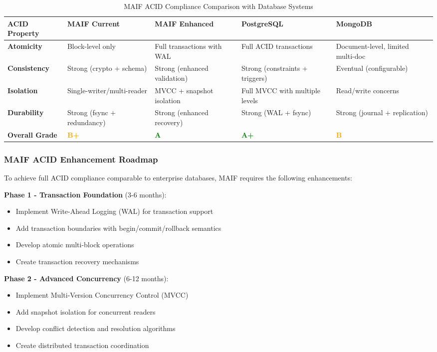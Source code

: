 \documentclass[conference]{IEEEtran}
\begin{document}
\begin{itemize}[leftmargin=*]
\begin{table*}[!t]
\renewcommand{\arraystretch}{1.3}
\caption{MAIF ACID Compliance Comparison with Database Systems}
\label{tab:acid-compliance}
\centering
\footnotesize
\begin{tabular}{p{2.5cm}p{3cm}p{3cm}p{3cm}p{3cm}}
\toprule
\textbf{ACID Property} & \textbf{MAIF Current} & \textbf{MAIF Enhanced} & \textbf{PostgreSQL} & \textbf{MongoDB} \\
\midrule
\textbf{Atomicity} & Block-level only & Full transactions with WAL & Full ACID transactions & Document-level, limited multi-doc \\
\textbf{Consistency} & Strong (crypto + schema) & Strong (enhanced validation) & Strong (constraints + triggers) & Eventual (configurable) \\
\textbf{Isolation} & Single-writer/multi-reader & MVCC + snapshot isolation & Full MVCC with multiple levels & Read/write concerns \\
\textbf{Durability} & Strong (fsync + redundancy) & Strong (enhanced recovery) & Strong (WAL + fsync) & Strong (journal + replication) \\
\midrule
\textbf{Overall Grade} & \textcolor{orange}{\textbf{B+}} & \textcolor{green}{\textbf{A}} & \textcolor{green}{\textbf{A+}} & \textcolor{orange}{\textbf{B}} \\
\bottomrule
\end{tabular}
\end{table*}

\subsubsection{MAIF ACID Enhancement Roadmap}

To achieve full ACID compliance comparable to enterprise databases, MAIF requires the following enhancements:

\textbf{Phase 1 - Transaction Foundation} (3-6 months):
\begin{itemize}[leftmargin=*]
\item Implement Write-Ahead Logging (WAL) for transaction support
\item Add transaction boundaries with begin/commit/rollback semantics
\item Develop atomic multi-block operations
\item Create transaction recovery mechanisms
\end{itemize}

\textbf{Phase 2 - Advanced Concurrency} (6-12 months):
\begin{itemize}[leftmargin=*]
\item Implement Multi-Version Concurrency Control (MVCC)
\item Add snapshot isolation for concurrent readers
\item Develop conflict detection and resolution algorithms
\item Create distributed transaction coordination
\end{itemize}


\end{itemize}
\end{document}
